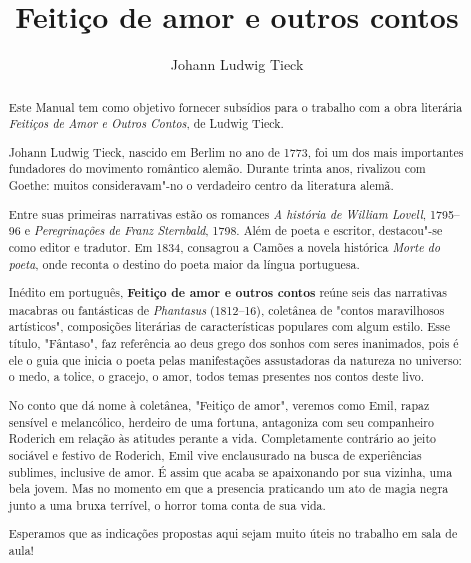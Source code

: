 \documentclass[11pt]{extarticle}
\begin{document}
\newcommand{\AutorLivro}{Johann Ludwig Tieck}
\newcommand{\TituloLivro}{Feitiço de amor e outros contos}
\newcommand{\Tema}{Ficção, mistério e fantasia}
\newcommand{\Genero}{Conto, crônica e novela}
\newcommand{\imagemCapa}{./images/PNLD0041-01.png}
\newcommand{\issnppub}{---}
\newcommand{\issnepub}{---}
\newcommand{\colaborador}{\textbf{Michelle Etienne Florence, Bruno Gradella e Vicente Castro} Sofia Boldrini (edição)}


\title{\TituloLivro}
\author{\AutorLivro}
\def\authornotes{\colaborador}

\date{}
\maketitle

\baselineskip\par

\begin{abstract}
Este Manual tem como objetivo fornecer subsídios para o trabalho com a
obra literária \emph{Feitiços de Amor e Outros Contos}, de Ludwig Tieck.

Johann Ludwig Tieck, nascido em Berlim no ano de 1773, foi um dos mais 
importantes fundadores do movimento romântico alemão. Durante trinta anos, 
rivalizou com Goethe: muitos consideravam"-no o verdadeiro centro da
literatura alemã. 

Entre suas primeiras narrativas estão os romances \emph{A história de William 
Lovell}, 1795–96 e \emph{Peregrinações de Franz Sternbald}, 1798. Além de poeta 
e escritor, destacou"-se como editor e tradutor. Em 1834, consagrou a Camões
a novela histórica \emph{Morte do poeta}, onde reconta o destino do poeta 
maior da língua portuguesa. 

Inédito em português, \textbf{Feitiço de amor e outros contos} reúne seis das 
narrativas macabras ou fantásticas de \textit{Phantasus} (1812--16), coletânea 
de "contos maravilhosos artísticos", composições literárias de características 
populares com algum estilo. Esse título, "Fântaso", faz referência ao deus grego 
dos sonhos com seres inanimados, pois é ele o guia que inicia o poeta pelas
manifestações assustadoras da natureza no universo: o medo, a tolice, o gracejo, 
o amor, todos temas presentes nos contos deste livo. 

No conto que dá nome à coletânea, "Feitiço de amor", veremos como Emil, rapaz
sensível e melancólico, herdeiro de uma fortuna, antagoniza com seu companheiro 
Roderich em relação às atitudes perante a vida. Completamente contrário ao jeito
sociável e festivo de Roderich, Emil vive enclausurado na busca de experiências 
sublimes, inclusive de amor. É assim que acaba se apaixonando por sua vizinha, 
uma bela jovem. Mas no momento em que a presencia praticando um ato de magia negra
junto a uma bruxa terrível, o horror toma conta de sua vida. 

Esperamos que as indicações propostas aqui sejam muito úteis no trabalho em
sala de aula! 





\end{abstract}
\end{document}

